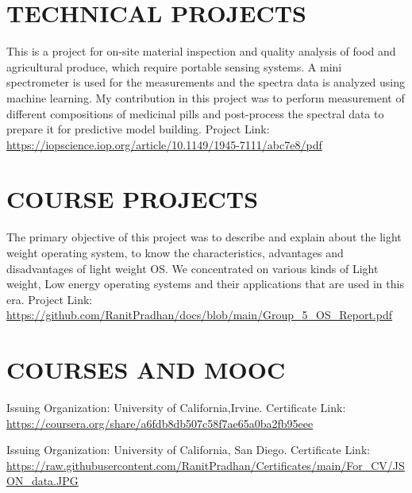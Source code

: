 \documentclass[11pt,a4paper,sans]{moderncv}        %
\begin{document}
\section{TECHNICAL PROJECTS}

{This is a project for on-site material inspection and quality analysis of food and agricultural produce, which require portable sensing systems. A mini spectrometer is used for the measurements and the spectra data is analyzed using machine learning. My contribution in this project was to perform measurement of different compositions of medicinal pills and post-process the spectral data to prepare it for predictive model building.{\newline}
Project Link: {\newline}
\url{https://iopscience.iop.org/article/10.1149/1945-7111/abc7e8/pdf}}{}

\section{COURSE PROJECTS}

{The primary objective of this project was to  describe  and  explain about the light weight operating system, to know the characteristics, advantages and disadvantages of light weight OS. We concentrated on various kinds of Light weight, Low energy operating  systems and  their  applications  that  are used in this era.{\newline} 
Project Link:{\newline}
\url{https://github.com/RanitPradhan/docs/blob/main/Group_5_OS_Report.pdf}}{}


\section{COURSES AND MOOC}
{Issuing Organization: University of California,Irvine.{\newline}
Certificate Link:
\url{ https://coursera.org/share/a6fdb8db507c58f7ae65a0ba2fb95eee}}{}

{Issuing Organization: University of California, San Diego.{\newline}
Certificate Link:
\url{https://raw.githubusercontent.com/RanitPradhan/Certificates/main/For_CV/JSON_data.JPG}}{}
\end{document}
